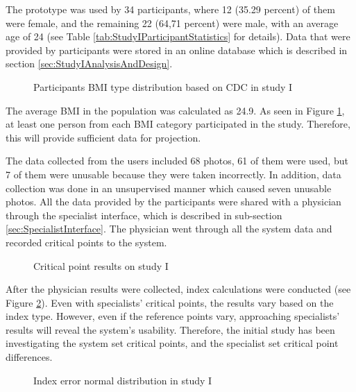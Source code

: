 The prototype was used by 34 participants, where 12 (35.29 percent) of them were female, and the remaining 22 (64,71 percent) were male, with an average age of 24 (see Table \ref{tab:StudyIParticipantStatistics} for details). Data that were provided by participants were stored in an online database which is described in section \ref{sec:StudyIAnalysisAndDesign}. 

\begin{figure}[htbp]
\centering
{}
\caption{Participants BMI type distribution based on CDC in study I}
\label{fig:StudyIParticipantsBMITypeDistribution}
\end{figure}

The average BMI in the population was calculated as 24.9. As seen in Figure \ref{fig:StudyIParticipantsBMITypeDistribution}, at least one person from each BMI category participated in the study. Therefore, this will provide sufficient data for projection.

The data collected from the users included 68 photos, 61 of them were used, but 7 of them were unusable because they were taken incorrectly. In addition, data collection was done in an unsupervised manner which caused seven unusable photos. All the data provided by the participants were shared with a physician through the specialist interface, which is described in sub-section \ref{sec:SpecialistInterface}. The physician went through all the system data and recorded critical points to the system.

\begin{figure}[htbp]
\centering
{}
\caption{Critical point results on study I}
\label{fig:StudyICriticalPointResult}
\end{figure}

After the physician results were collected, index calculations were conducted (see Figure \ref{fig:StudyICriticalPointResult}). Even with specialists' critical points, the results vary based on the index type. However, even if the reference points vary, approaching specialists' results will reveal the system's usability. Therefore, the initial study has been investigating the system set critical points, and the specialist set critical point differences.

\begin{figure}[htbp]
\centering
{}
\caption{Index error normal distribution in study I}
\label{fig:StudyIIndexErrorNormalDists}
\end{figure}

